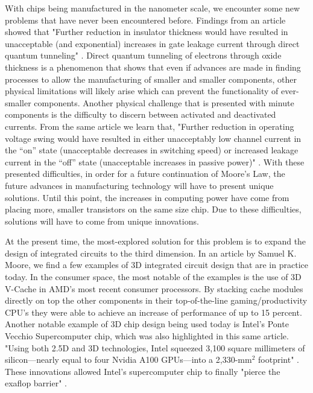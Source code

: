 \documentclass[12pt]{article}
\begin{document}
\begin{flushleft}
With chips being manufactured in the nanometer scale,
we encounter some new problems that have never been
encountered before. Findings from an article showed
that "Further reduction in insulator thickness would
have resulted in unacceptable (and exponential) increases
in gate leakage current through direct quantum tunneling"
\parencite{7878935}. Direct quantum tunneling of electrons
through oxide thickness is a phenomenon that shows
that even if advances are made in finding processes
to allow the manufacturing of smaller and smaller components,
other physical limitations will likely arise which
can prevent the functionality of ever-smaller components.
Another physical challenge that is presented with
minute components is the difficulty to discern between
activated and deactivated currents. From the same
article we learn that, "Further reduction in operating
voltage swing would have resulted in either unacceptably
low channel current in the “on” state (unacceptable
decreases in switching speed) or increased leakage
current in the “off” state (unacceptable increases
in passive power)" \parencite{7878935}. With these
presented difficulties, in order for a future continuation
of Moore's Law, the future advances in manufacturing
technology will have to present unique solutions.
Until this point, the increases in computing power
have come from placing more, smaller transistors on
the same size chip. Due to these difficulties, solutions
will have to come from unique innovations.

At the present time, the most-explored solution for
this problem is to expand the design of integrated
circuits to the third dimension. In an article by Samuel
K. Moore, we find a few examples of 3D integrated circuit
design that are in practice today. In the consumer
space, the most notable of the examples is the use
of 3D V-Cache in AMD's most recent consumer processors.
By stacking cache modules directly on top the other
components in their top-of-the-line gaming/productivity
CPU's they were able to achieve an increase of performance
of up to 15 percent. Another notable example of 3D
chip design being used today is Intel's Ponte Vecchio
Supercomputer chip, which was also highlighted in
this same article. "Using both 2.5D and 3D technologies,
Intel squeezed 3,100 square millimeters of silicon—nearly
equal to four Nvidia A100 GPUs—into a 2,330-mm$^2$ footprint"
\parencite{9792148}. These innovations allowed Intel's
supercomputer chip to finally "pierce the exaflop barrier"
\parencite{9792148}.


\end{flushleft}
\end{document}
